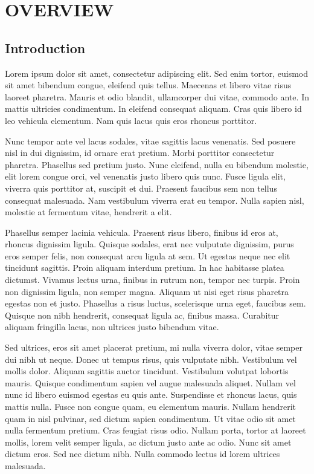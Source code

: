 \chapter{OVERVIEW}

\section*{Introduction}

Lorem ipsum dolor sit amet, consectetur adipiscing elit. Sed enim tortor, euismod sit amet bibendum congue, eleifend quis tellus. Maecenas et libero vitae risus laoreet pharetra. Mauris et odio blandit, ullamcorper dui vitae, commodo ante. In mattis ultricies condimentum. In eleifend consequat aliquam. Cras quis libero id leo vehicula elementum. Nam quis lacus quis eros rhoncus porttitor.

Nunc tempor ante vel lacus sodales, vitae sagittis lacus venenatis. Sed posuere nisl in dui dignissim, id ornare erat pretium. Morbi porttitor consectetur pharetra. Phasellus sed pretium justo. Nunc eleifend, nulla eu bibendum molestie, elit lorem congue orci, vel venenatis justo libero quis nunc. Fusce ligula elit, viverra quis porttitor at, suscipit et dui. Praesent faucibus sem non tellus consequat malesuada. Nam vestibulum viverra erat eu tempor. Nulla sapien nisl, molestie at fermentum vitae, hendrerit a elit.

Phasellus semper lacinia vehicula. Praesent risus libero, finibus id eros at, rhoncus dignissim ligula. Quisque sodales, erat nec vulputate dignissim, purus eros semper felis, non consequat arcu ligula at sem. Ut egestas neque nec elit tincidunt sagittis. Proin aliquam interdum pretium. In hac habitasse platea dictumst. Vivamus lectus urna, finibus in rutrum non, tempor nec turpis. Proin non dignissim ligula, non semper magna. Aliquam ut nisi eget risus pharetra egestas non et justo. Phasellus a risus luctus, scelerisque urna eget, faucibus sem. Quisque non nibh hendrerit, consequat ligula ac, finibus massa. Curabitur aliquam fringilla lacus, non ultrices justo bibendum vitae.

Sed ultrices, eros sit amet placerat pretium, mi nulla viverra dolor, vitae semper dui nibh ut neque. Donec ut tempus risus, quis vulputate nibh. Vestibulum vel mollis dolor. Aliquam sagittis auctor tincidunt. Vestibulum volutpat lobortis mauris. Quisque condimentum sapien vel augue malesuada aliquet. Nullam vel nunc id libero euismod egestas eu quis ante. Suspendisse et rhoncus lacus, quis mattis nulla. Fusce non congue quam, eu elementum mauris. Nullam hendrerit quam in nisl pulvinar, sed dictum sapien condimentum. Ut vitae odio sit amet nulla fermentum pretium. Cras feugiat risus odio. Nullam porta, tortor at laoreet mollis, lorem velit semper ligula, ac dictum justo ante ac odio. Nunc sit amet dictum eros. Sed nec dictum nibh. Nulla commodo lectus id lorem ultrices malesuada.

